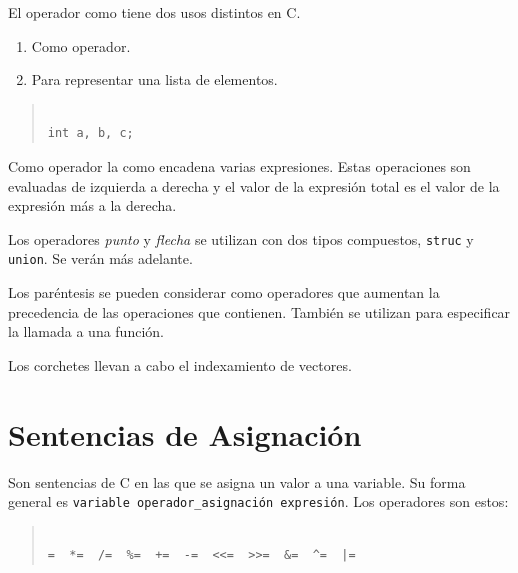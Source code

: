 
El operador como tiene dos usos distintos en C.

\begin{enumerate}

\item Como operador.

\item Para representar una lista de elementos.

\end{enumerate}

\begin{quotation}
\begin{verbatim}

int a, b, c;

\end{verbatim}
\end{quotation}

Como operador la como encadena varias expresiones. Estas operaciones son
evaluadas de izquierda a derecha y el valor de la expresi\'on total es el
valor de la expresi\'on m\'as a la derecha.


Los operadores \emph{punto} y \emph{flecha} se utilizan con dos tipos 
compuestos, \texttt{struc} y \texttt{union}. Se ver\'an m\'as adelante.


Los par\'entesis se pueden considerar como operadores que aumentan la 
precedencia de  las operaciones que contienen. Tambi\'en se utilizan para 
especificar la llamada a una funci\'on.


Los corchetes llevan a cabo el indexamiento de vectores.

\section{Sentencias de Asignaci\'on}

Son sentencias de C en las que se asigna un valor a una variable. Su forma 
general es  \texttt{variable operador\_asignaci\'on expresi\'on}. Los 
operadores son estos:

\begin{quotation}
\begin{verbatim}

=  *=  /=  %=  +=  -=  <<=  >>=  &=  ^=  |=

\end{verbatim}
\end{quotation}


